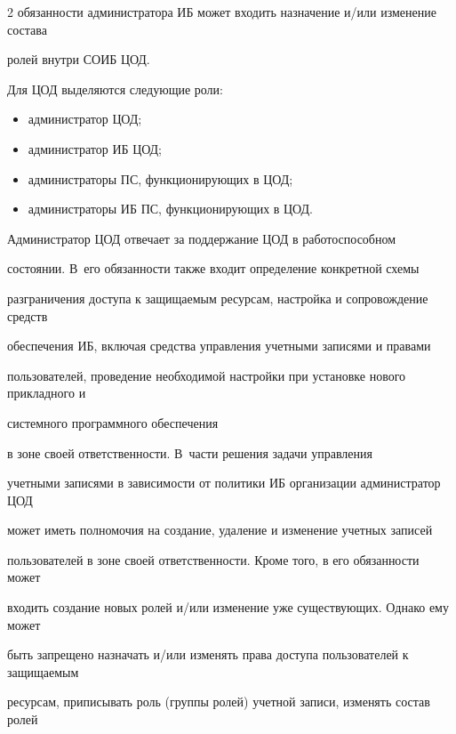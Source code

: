\begin{multicols}{2}
обязанности администратора ИБ может входить назначение и/или изменение состава 


ролей внутри СОИБ ЦОД.


       


       Для ЦОД выделяются следующие роли:


       \begin{itemize}


\item администратор ЦОД;


\item администратор ИБ ЦОД;


\item администраторы ПС, функционирующих в ЦОД;


\item администраторы ИБ ПС, функционирующих в ЦОД.


\end{itemize}





       Администратор ЦОД отвечает за поддержание ЦОД в работоспособном 


состоянии. В~его обязанности также входит определение конкретной схемы 


разграничения доступа к защищаемым ресурсам, настройка и сопровождение средств 


обеспечения ИБ, включая средства управления учетными записями и правами 


пользователей, проведение необходимой настройки при уста\-нов\-ке нового прикладного и 


сис\-тем\-но\-го программного обеспечения 


в зоне своей ответственности. В~час\-ти решения задачи управ\-ле\-ния 


учетными записями в зависимости от политики ИБ организации администратор ЦОД 


может иметь полномочия на создание, удаление и изменение учетных записей 


пользователей в зоне своей ответственности. Кроме того, в его обязанности может 


входить создание новых ролей и/или изменение уже существующих. Однако ему может 


быть запрещено назначать и/или изменять права доступа пользователей к защищаемым 


ресурсам, приписывать роль (группы ролей) учетной записи, изменять состав ролей 



\end{multicols}
